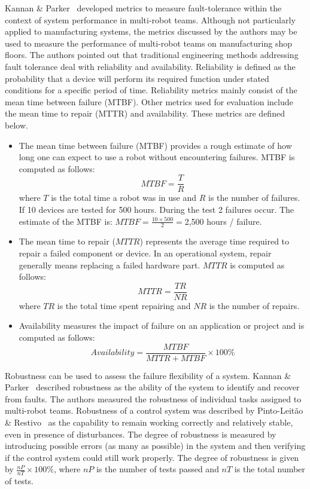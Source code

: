 Kannan \& Parker~\cite{Kannan.2006}  developed metrics to measure fault-tolerance within the context of system performance in multi-robot teams. Although not particularly applied to manufacturing systems, the metrics discussed by the authors may be used to measure the performance of multi-robot teams on manufacturing shop floors. The authors pointed out that traditional engineering methods addressing fault tolerance deal with reliability and availability. Reliability is defined as the probability that a device will perform its required function under stated conditions for a specific period of time. Reliability  metrics mainly consist of the mean time between failure (MTBF). Other metrics used for evaluation include the mean time to repair (MTTR) and availability. These metrics are defined below.
\begin{itemize}
\item The mean time between failure (MTBF) provides a rough estimate of how long one can expect to use a robot without encountering failures. MTBF is computed as follows:
    \begin{equation}
    MTBF=\frac{T}{R}
    \end{equation}
    where $T$ is the total time a robot was in use and $R$ is the number of failures. If 10 devices are tested for 500 hours. During the test 2 failures occur. The estimate of the MTBF is: $MTBF=\frac{10\times 500}{2}=$2,500 hours / failure.
\item The mean time to repair ($MTTR$) represents the average time required to repair a failed component or device. In an operational system, repair generally means replacing a failed hardware part. $MTTR$ is computed as follows:
    \begin{equation}
    MTTR=\frac{TR}{NR}
    \end{equation}
    where $TR$ is the total time spent repairing and $NR$ is the number of repairs.
\item Availability measures the impact of failure on an application or project and is computed as follows:
\begin{equation}
Availability=\frac{MTBF}{MTTR+MTBF}\times 100 \%
\end{equation}
\end{itemize}

Robustness can be used to assess the failure flexibility of a system. Kannan \& Parker~\cite{Kannan.2006} described robustness as the ability of the system to identify and recover from faults. The authors measured the robustness of individual tasks assigned to multi-robot teams. Robustness of a control system was described by Pinto-Leit\~{a}o \& Restivo~\cite{Leitao.2004} as the capability to remain working correctly and relatively stable, even in presence of disturbances. The degree of robustness is measured by introducing possible errors (as many as possible) in the system and then verifying if the control system could still work properly. The degree of robustness is given by $\frac{nP}{nT}\times 100 \%$, where $nP$ is the number of tests passed and $nT$ is the total number of tests.
